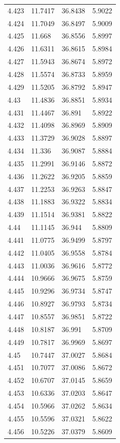 \begin{tabular}{llll}
4.423 & 11.7417 & 36.8438 & 5.9022 \\
4.424 & 11.7049 & 36.8497 & 5.9009 \\
4.425 & 11.668 & 36.8556 & 5.8997 \\
4.426 & 11.6311 & 36.8615 & 5.8984 \\
4.427 & 11.5943 & 36.8674 & 5.8972 \\
4.428 & 11.5574 & 36.8733 & 5.8959 \\
4.429 & 11.5205 & 36.8792 & 5.8947 \\
4.43 & 11.4836 & 36.8851 & 5.8934 \\
4.431 & 11.4467 & 36.891 & 5.8922 \\
4.432 & 11.4098 & 36.8969 & 5.8909 \\
4.433 & 11.3729 & 36.9028 & 5.8897 \\
4.434 & 11.336 & 36.9087 & 5.8884 \\
4.435 & 11.2991 & 36.9146 & 5.8872 \\
4.436 & 11.2622 & 36.9205 & 5.8859 \\
4.437 & 11.2253 & 36.9263 & 5.8847 \\
4.438 & 11.1883 & 36.9322 & 5.8834 \\
4.439 & 11.1514 & 36.9381 & 5.8822 \\
4.44 & 11.1145 & 36.944 & 5.8809 \\
4.441 & 11.0775 & 36.9499 & 5.8797 \\
4.442 & 11.0405 & 36.9558 & 5.8784 \\
4.443 & 11.0036 & 36.9616 & 5.8772 \\
4.444 & 10.9666 & 36.9675 & 5.8759 \\
4.445 & 10.9296 & 36.9734 & 5.8747 \\
4.446 & 10.8927 & 36.9793 & 5.8734 \\
4.447 & 10.8557 & 36.9851 & 5.8722 \\
4.448 & 10.8187 & 36.991 & 5.8709 \\
4.449 & 10.7817 & 36.9969 & 5.8697 \\
4.45 & 10.7447 & 37.0027 & 5.8684 \\
4.451 & 10.7077 & 37.0086 & 5.8672 \\
4.452 & 10.6707 & 37.0145 & 5.8659 \\
4.453 & 10.6336 & 37.0203 & 5.8647 \\
4.454 & 10.5966 & 37.0262 & 5.8634 \\
4.455 & 10.5596 & 37.0321 & 5.8622 \\
4.456 & 10.5226 & 37.0379 & 5.8609 \\

\end{tabular}
